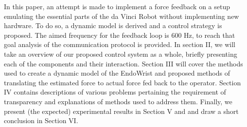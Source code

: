 
In this paper, an attempt is made to implement a force feedback on a setup emulating the essential parts of the da Vinci Robot without implementing new hardware. To do so, a dynamic model is derived and a control strategy is proposed. The aimed frequency for the feedback loop is 600 Hz, to reach that goal analysis of the communication protocol is provided. In section II, we will take an overview of our proposed control system as a whole, briefly presenting each of the components and their interaction.
Section III will cover the methods used to create a dynamic model of the EndoWrist and proposed methods of translating the estimated force to actual force fed back to the operator.
Section IV contains descriptions of various problems pertaining the requirement of transparency and explanations of methods used to address them.
Finally,  we present (the expected) experimental results in Section V and and draw a short conclusion in Section VI.





